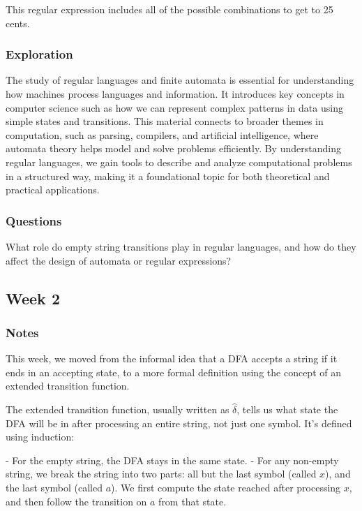 \documentclass{article}
\theoremstyle{theorem}
\theoremstyle{definition}
\theoremstyle{remark}
\begin{document}
This regular expression includes all of the possible combinations to get to 25 cents.


\subsubsection{Exploration}

The study of regular languages and finite automata is essential for understanding how machines process languages and information. It introduces key concepts in computer science such as how we can represent complex patterns in data using simple states and transitions. This material connects to broader themes in computation, such as parsing, compilers, and artificial intelligence, where automata theory helps model and solve problems efficiently. By understanding regular languages, we gain tools to describe and analyze computational problems in a structured way, making it a foundational topic for both theoretical and practical applications.


\subsubsection{Questions}

What role do empty string transitions play in regular languages, and how do they affect the design of automata or regular expressions?

\subsection{Week 2}

\subsubsection{Notes}

This week, we moved from the informal idea that a DFA accepts a string if it ends in an accepting state, to a more formal definition using the concept of an extended transition function.

The extended transition function, usually written as $\hat{\delta}$, tells us what state the DFA will be in after processing an entire string, not just one symbol. It's defined using induction:

- For the empty string, the DFA stays in the same state.
- For any non-empty string, we break the string into two parts: all but the last symbol (called $x$), and the last symbol (called $a$). We first compute the state reached after processing $x$, and then follow the transition on $a$ from that state.
\end{document}
